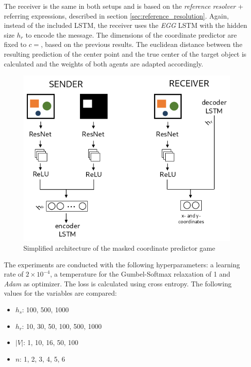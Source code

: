 The receiver is the same in both setups and is based on the \emph{reference resolver} + referring expressions, described in section \ref{sec:reference_resolution}.
Again, instead of the included LSTM, the receiver uses the \emph{EGG} LSTM with the hidden size $h_r$ to encode the message.
The dimensions of the coordinate predictor are fixed to $c=$, based on the previous results.
The euclidean distance between the resulting prediction of the center point and the true center of the target object is calculated and the weights of both agents are adapted accordingly.

\begin{figure}[ht]
    \centering
    \includegraphics[width=.7\linewidth]{figures/arch_coordinate_predictor_game.png}
    \caption{Simplified architecture of the masked coordinate predictor game}
    \label{fig:coordinate_predictor_game_architecture}
\end{figure}


The experiments are conducted with the following hyperparameters: a learning rate of $2\times10^{-4}$, a temperature for the Gumbel-Softmax relaxation of 1 and \emph{Adam} \citep{Kingma2015} as optimizer.
The loss is calculated using cross entropy.
The following values for the variables are compared:
\begin{itemize}
    \item $h_s$: 100, 500, 1000
    \item $h_r$: 10, 30, 50, 100, 500, 1000
    \item $|V|$: 1, 10, 16, 50, 100
    \item $n$: 1, 2, 3, 4, 5, 6
\end{itemize}


